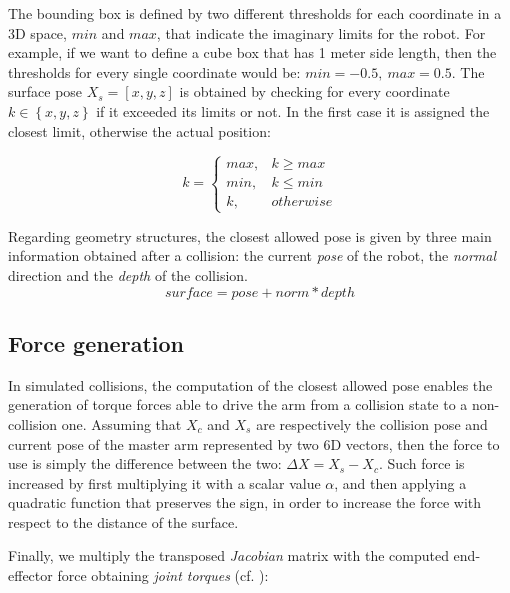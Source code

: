 \documentclass[runningheads]{llncs}
\begin{document}
The bounding box is defined by two different thresholds for each coordinate in a 3D space, $min$ and $max$, that indicate the imaginary limits for the robot. For example, if we want to define a cube box that has 1 meter side length, then the thresholds for every single coordinate would be: $ min = -0.5,\ max = 0.5 $.
The surface pose $X_s = [x,y,z]$ is obtained by checking for every coordinate $ k \in \left\{x,y,z\right\} $ if it exceeded its limits or not. In the first case it is assigned the closest limit, otherwise the actual position:

\begin{equation}
k =
\begin{cases}
max, &  k \ge max \\
min, & k \leq min \\
k, & otherwise
\end{cases}
\end{equation}


Regarding geometry structures, the closest allowed pose is given by three main information obtained after a collision: the current \textit{pose} of the robot, the \textit{normal} direction and the \textit{depth} of the collision.
\begin{equation}
surface = pose + norm * depth
\end{equation}


\subsection{Force generation}

In simulated collisions, the computation of the closest allowed pose enables the generation of torque forces able to drive the arm from a collision state to a non-collision one. Assuming that $X_c$ and $X_s$ are respectively the collision pose and current pose of the master arm represented by two 6D vectors, then the force to use is simply the difference between the two: $ \Delta X = X_s - X_c $. Such force is increased by first multiplying it with a scalar value $\alpha$, and then applying a quadratic function that preserves the sign, in order to increase the force with respect to the distance of the surface.

Finally, we multiply the transposed \textit{Jacobian} matrix with the computed end-effector force obtaining \textit{joint torques} (cf. \cite{rrl}):
\end{document}

